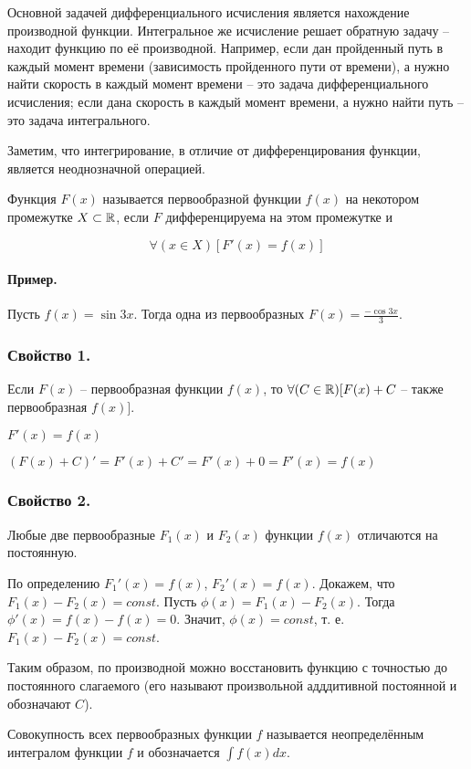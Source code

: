 Основной задачей дифференциального исчисления является нахождение производной функции. Интегральное же исчисление решает обратную задачу -- находит функцию по её производной. Например, если дан пройденный путь в каждый момент времени (зависимость пройденного пути от времени), а нужно найти скорость в каждый момент времени -- это задача дифференциального исчисления; если дана скорость в каждый момент времени, а нужно найти путь -- это задача интегрального.

Заметим, что интегрирование, в отличие от дифференцирования функции, является неоднозначной операцией.

\opred
Функция $F(x)$ называется первообразной функции $f(x)$ на некотором промежутке $X \subset \mathbb{R}$, если $F$ дифференцируема на этом промежутке и 

$$
\forall(x\in X)[F'(x)=f(x)]
$$

\paragraph{Пример.}
Пусть $f(x)=\sin 3x$. Тогда одна из первообразных $F(x)=\frac{-\cos 3x}{3}$.

\subsubsection{Свойство 1.}
Если $F(x)$ -- первообразная функции $f(x)$, то $\forall(C\in\mathbb{R})[F(x)+C$ -- также первообразная $f(x)]$.

\dokvo
$F'(x)=f(x)$

$(F(x)+C)'=F'(x)+C'=F'(x)+0=F'(x)=f(x)$

\dokno

\subsubsection{Свойство 2.}
Любые две первообразные $F_1(x)$ и $F_2(x)$ функции $f(x)$ отличаются на постоянную.

\dokvo

По определению $F_1'(x)=f(x)$, $F_2'(x)=f(x)$.
Докажем, что $F_1(x)-F_2(x)=const$.
Пусть $\phi(x)=F_1(x)-F_2(x)$.
Тогда $\phi'(x)=f(x)-f(x)=0$.
Значит, $\phi(x)=const$, т. е. $F_1(x)-F_2(x)=const$.

\dokno

Таким образом, по производной можно восстановить функцию с точностью до постоянного слагаемого (его называют произвольной адддитивной постоянной и обозначают $C$).

\opred
Совокупность всех первообразных функции $f$ называется неопределённым интегралом функции $f$ и обозначается $\int f(x) dx$.

